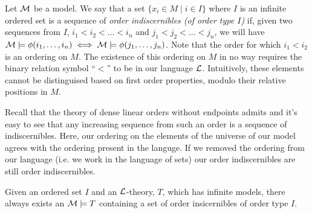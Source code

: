 \begin{definition}\label{definition_order_indiscernibles}
Let \(\mathcal{M}\) be a model.
We say that a set \(\{x_i \in M \mid i \in I\}\) where \(I\) is an infinite ordered set is a sequence of \textit{order indiscernibles (of order type \(I\))} if, given two sequences from \(I\), 
\(i_1 < i_2 < \ldots < i_n\) and \(j_1 < j_2 < \ldots < j_n\), we will have \(\mathcal{M} \models \phi(i_1, \ldots, i_n) \iff \mathcal{M} \models \phi(j_1, \ldots, j_n)\). 
Note that the order for which \(i_1 < i_2\) is an ordering on \(M\).
The existence of this ordering on \(M\) in no way requires the binary relation symbol ``\(<\)'' to be in our language \(\mathcal{L}\). 
Intuitively, these elements cannot be distinguised based on first order properties, modulo their relative positions in \(M\).  
\end{definition}

Recall that the theory of dense linear orders without endpoints admits \qe and it's easy to see that any increasing sequence from such an order is a sequence of indiscernibles. 
Here, our ordering on the elements of the universe of our model agrees with the ordering present in the languge. 
If we removed the ordering from our language (i.e. we work in the language of sets) our order indiscernibles are still order indiscernibles. 

\begin{theorem}\label{theorem_order_indiscernibles}
Given an ordered set \(I\) and an \(\mathcal{L}\)-theory, \(T\), which has infinite models, there always exists an \(\mathcal{M} \models T\) containing a set of order insicernibles of order type \(I\). 
\end{theorem}


